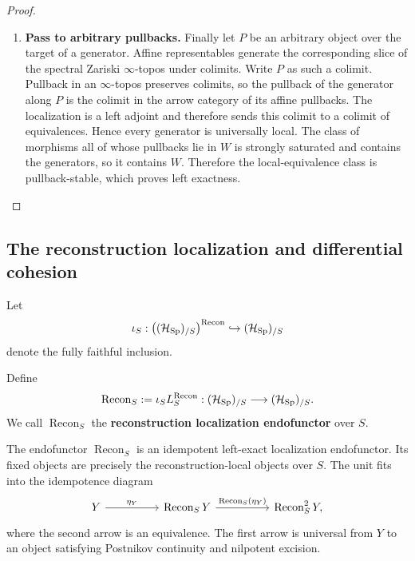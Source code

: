 \begin{proof}
\begin{enumerate}[label=\textup{(\arabic*)}]
    \item \textbf{Pass to arbitrary pullbacks.}
    Finally let \(P\) be an arbitrary object over the target of a generator.
    Affine representables generate the corresponding slice of the spectral Zariski
    \(\infty\)-topos under colimits. Write \(P\) as such a colimit. Pullback in
    an \(\infty\)-topos preserves colimits, so the pullback of the generator along
    \(P\) is the colimit in the arrow category of its affine pullbacks. The
    localization is a left adjoint and therefore sends this colimit to a colimit of
    equivalences. Hence every generator is universally local. The class of
    morphisms all of whose pullbacks lie in \(W\) is strongly saturated and
    contains the generators, so it contains \(W\). Therefore the local-equivalence
    class is pullback-stable, which proves left exactness.
\end{enumerate}
\end{proof}

\subsection{The reconstruction localization and differential cohesion}

Let
\[
    \iota_S:
    \bigl((\mathcal H_{\operatorname{Sp}})_{/S}\bigr)^{\mathrm{Recon}}
    \hookrightarrow
    (\mathcal H_{\operatorname{Sp}})_{/S}
\]
denote the fully faithful inclusion.

\begin{definition}
\label{def:reconstruction-localization-endofunctor}
Define
\[
    \operatorname{Recon}_S
    :=
    \iota_S L^{\mathrm{Recon}}_S
    :
    (\mathcal H_{\operatorname{Sp}})_{/S}
    \longrightarrow
    (\mathcal H_{\operatorname{Sp}})_{/S}.
\]
We call \(\operatorname{Recon}_S\) the \textbf{reconstruction localization endofunctor} over \(S\).
\end{definition}

\begin{proposition}
\label{prop:reconstruction-localization-idempotence}
The endofunctor \(\operatorname{Recon}_S\) is an idempotent left-exact localization endofunctor.
Its fixed objects are precisely the reconstruction-local objects over \(S\). The unit fits into the idempotence diagram
\[
\begin{tikzcd}[column sep=huge]
    Y \arrow[r,"\eta_Y"]
        &
    \operatorname{Recon}_S Y
        \arrow[r,"\operatorname{Recon}_S(\eta_Y)"]
        &
    \operatorname{Recon}_S^2Y ,
\end{tikzcd}
\]
where the second arrow is an equivalence. The first arrow is universal from
\(Y\) to an object satisfying Postnikov continuity and nilpotent excision.
\end{proposition}

